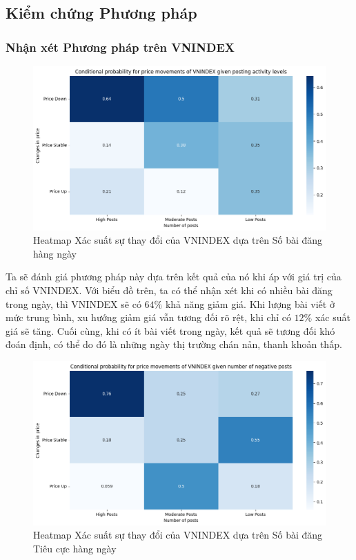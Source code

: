 \subsection{Kiểm chứng Phương pháp}
\subsubsection*{Nhận xét Phương pháp trên VNINDEX}
 \begin{figure}[H]
     \centering
     \includegraphics[width=0.9\linewidth]{images/plot-5.1-hmvniall.png}
     \caption{Heatmap Xác suất sự thay đổi của VNINDEX dựa trên Số bài đăng hàng ngày}
     \label{fig:5.1}
 \end{figure}

Ta sẽ đánh giá phương pháp này dựa trên kết quả của nó khi áp với giá trị của chỉ số VNINDEX. Với biểu đồ trên, ta có thể nhận xét khi có nhiều bài đăng trong ngày, thì VNINDEX sẽ có $64\%$ khả năng giảm giá. Khi lượng bài viết ở mức trung bình, xu hướng giảm giá vẫn tương đối rõ rệt, khi chỉ có $12\%$ xác suất giá sẽ tăng. Cuối cùng, khi có ít bài viết trong ngày, kết quả sẽ tương đối khó đoán định, có thể do đó là những ngày thị trường chán nản, thanh khoản thấp.

\begin{figure}[H]
    \centering
    \includegraphics[width=0.9\linewidth]{images/plot-5.2-hmvnineg.png}
    \caption{Heatmap Xác suất sự thay đổi của VNINDEX dựa trên Số bài đăng Tiêu cực hàng ngày}
    \label{fig:5.2}
\end{figure}

